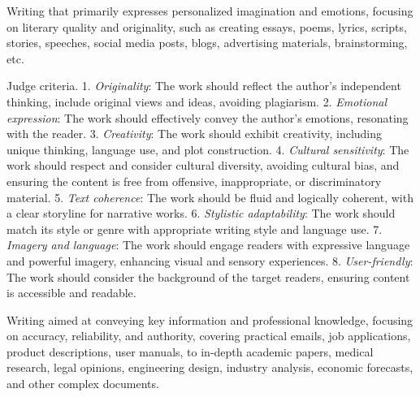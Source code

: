 
 Writing that primarily expresses personalized imagination and emotions, focusing on literary quality and originality, such as creating essays, poems, lyrics, scripts, stories, speeches, social media posts, blogs, advertising materials, brainstorming, etc.

Judge criteria.   
1. \emph{Originality}: The work should reflect the author's independent thinking, include original views and ideas, avoiding plagiarism.
2. \emph{Emotional expression}: The work should effectively convey the author's emotions, resonating with the reader.
3. \emph{Creativity}: The work should exhibit creativity, including unique thinking, language use, and plot construction.
4. \emph{Cultural sensitivity}: The work should respect and consider cultural diversity, avoiding cultural bias, and ensuring the content is free from offensive, inappropriate, or discriminatory material.
5. \emph{Text coherence}: The work should be fluid and logically coherent, with a clear storyline for narrative works.
6. \emph{Stylistic adaptability}: The work should match its style or genre with appropriate writing style and language use.
7. \emph{Imagery and language}: The work should engage readers with expressive language and powerful imagery, enhancing visual and sensory experiences.
8. \emph{User-friendly}: The work should consider the background of the target readers, ensuring content is accessible and readable.

 Writing aimed at conveying key information and professional knowledge, focusing on accuracy, reliability, and authority, covering practical emails, job applications, product descriptions, user manuals, to in-depth academic papers, medical research, legal opinions, engineering design, industry analysis, economic forecasts, and other complex documents.

